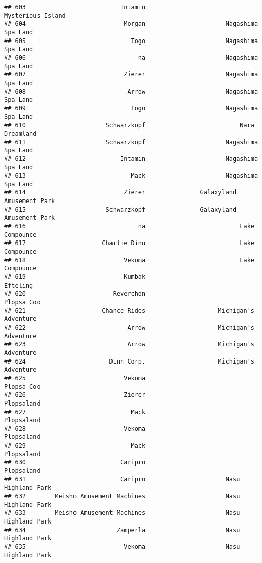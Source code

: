 \documentclass[
]{article}
\begin{document}
\begin{verbatim}
## 603                          Intamin                       Mysterious Island
## 604                           Morgan                      Nagashima Spa Land
## 605                             Togo                      Nagashima Spa Land
## 606                               na                      Nagashima Spa Land
## 607                           Zierer                      Nagashima Spa Land
## 608                            Arrow                      Nagashima Spa Land
## 609                             Togo                      Nagashima Spa Land
## 610                      Schwarzkopf                          Nara Dreamland
## 611                      Schwarzkopf                      Nagashima Spa Land
## 612                          Intamin                      Nagashima Spa Land
## 613                             Mack                      Nagashima Spa Land
## 614                           Zierer               Galaxyland Amusement Park
## 615                      Schwarzkopf               Galaxyland Amusement Park
## 616                               na                          Lake Compounce
## 617                     Charlie Dinn                          Lake Compounce
## 618                           Vekoma                          Lake Compounce
## 619                           Kumbak                                Efteling
## 620                        Reverchon                              Plopsa Coo
## 621                     Chance Rides                    Michigan's Adventure
## 622                            Arrow                    Michigan's Adventure
## 623                            Arrow                    Michigan's Adventure
## 624                       Dinn Corp.                    Michigan's Adventure
## 625                           Vekoma                              Plopsa Coo
## 626                           Zierer                              Plopsaland
## 627                             Mack                              Plopsaland
## 628                           Vekoma                              Plopsaland
## 629                             Mack                              Plopsaland
## 630                          Caripro                              Plopsaland
## 631                          Caripro                      Nasu Highland Park
## 632        Meisho Amusement Machines                      Nasu Highland Park
## 633        Meisho Amusement Machines                      Nasu Highland Park
## 634                         Zamperla                      Nasu Highland Park
## 635                           Vekoma                      Nasu Highland Park

\end{verbatim}
\end{document}
